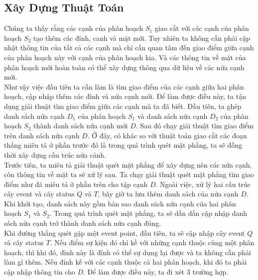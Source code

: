 \documentclass[15pt]{article}
\begin{document}
{\subsection{Xây Dựng Thuật Toán}
Chúng ta thấy rằng các cạnh của phân hoạch $S_1$ giao cắt với các cạnh của phân hoạch $S_2$ tạo thêm các đỉnh, canh và mặt mới. Tuy nhiên ta không cần phải cập nhật thông tin của tất cả các cạnh mà chỉ cần quan tâm đến giao điểm giữa cạnh của phân hoạch này với cạnh của phân hoạch kia. Và các thông tin về mặt của phân hoạch mới hoàn toàn có thể xây dựng thông qua dữ liệu về các nửa cạnh mới. \\

Như vậy việc đầu tiên ta cần làm là tìm giao điểm của các cạnh giữa hai phân hoạch, cập nhập thêm các đỉnh và nửa cạnh mới. Để làm được điều này, ta tận dụng giải thuật tìm giao điểm giữa các cạnh mà ta đã biết. Đầu tiên, ta ghép danh sách nửa cạnh $D_1$ của phân hoạch $S_1$ và danh sách nửa cạnh $D_2$ của phân hoạch $S_2$ thành danh sách nửa cạnh mới $D$. Sau đó chạy giải thuật tìm giao điểm trên danh sách nửa cạnh $D$. Ở đây, có khác so với thuật toán giao cắt các đoạn thẳng miêu tả ở phần trước đó là trong quá trình quét mặt phẳng, ta sẽ đồng thời xây dựng cấu trúc nửa cảnh. \\
Trước tiên, ta miêu tả giải thuật quét mặt phẳng để xây dựng nên các nửa cạnh, còn thông tin về mặt ta sẽ xử lý sau. Ta chạy giải thuật quét mặt phẳng tìm giao điểm như đã miêu tả ở phần trên cho tập cạnh $D$. Ngoài việc, xử lý hai cấu trúc cây event và cây status $Q$ và $T$, bây giờ ta lưu thêm danh sách của nửa cạnh $D$. Khi khởi tạo, danh sách này gồm bản sao danh sách nửa cạnh của hai phân hoạch $S_1$ và $S_2$. Trong quá trình quét mặt phẳng, ta sẽ dần dần cập nhập danh sách nửa cạnh trở thành danh sách nửa cạnh đúng. \\

Khi đường thẳng quét gặp một event point, đầu tiên, ta sẽ cập nhập cây event $Q$ và cây status $T$. Nếu điểm sự kiện đó chỉ kề với những cạnh thuộc cùng một phân hoạch, thì khi đó, đỉnh này là đỉnh có thể sự dụng lại được và ta không cần phải làm gì thêm. Nếu đỉnh kề với các cạnh thuộc cả hai phân hoạch, khi đó ta phải cập nhập thông tin cho $D$. Để làm được điều này, ta đi xét 3 trường hợp. \\

}
\end{document}

